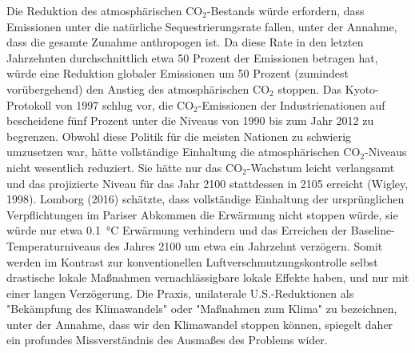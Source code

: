 \documentclass[12pt,paper=a4,DIV=12,parskip=never,chapterprefix=false,headings=standardclasses]{scrreprt}
\begin{document}
Die Reduktion des atmosphärischen CO$_2$-Bestands würde erfordern, dass Emissionen unter die natürliche Sequestrierungsrate fallen, unter der Annahme, dass die gesamte Zunahme anthropogen ist. Da diese Rate in den letzten Jahrzehnten durchschnittlich etwa 50 Prozent der Emissionen betragen hat, würde eine Reduktion globaler Emissionen um 50 Prozent (zumindest vorübergehend) den Anstieg des atmosphärischen CO$_2$ stoppen. Das Kyoto-Protokoll von 1997 schlug vor, die CO$_2$-Emissionen der Industrienationen auf bescheidene fünf Prozent unter die Niveaus von 1990 bis zum Jahr 2012 zu begrenzen. Obwohl diese Politik für die meisten Nationen zu schwierig umzusetzen war, hätte vollständige Einhaltung die atmosphärischen CO$_2$-Niveaus nicht wesentlich reduziert. Sie hätte nur das CO$_2$-Wachstum leicht verlangsamt und das projizierte Niveau für das Jahr 2100 stattdessen in 2105 erreicht (Wigley, 1998). Lomborg (2016) schätzte, dass vollständige Einhaltung der ursprünglichen Verpflichtungen im Pariser Abkommen die Erwärmung nicht stoppen würde, sie würde nur etwa \SI{0.1}{\celsius} Erwärmung verhindern und das Erreichen der Baseline-Temperaturniveaus des Jahres 2100 um etwa ein Jahrzehnt verzögern.
Somit werden im Kontrast zur konventionellen Luftverschmutzungskontrolle selbst drastische lokale Maßnahmen vernachlässigbare lokale Effekte haben, und nur mit einer langen Verzögerung. Die Praxis, unilaterale U.S.-Reduktionen als "Bekämpfung des Klimawandels" oder "Maßnahmen zum Klima" zu bezeichnen, unter der Annahme, dass wir den Klimawandel stoppen können, spiegelt daher ein profundes Missverständnis des Ausmaßes des Problems wider.
\end{document}
